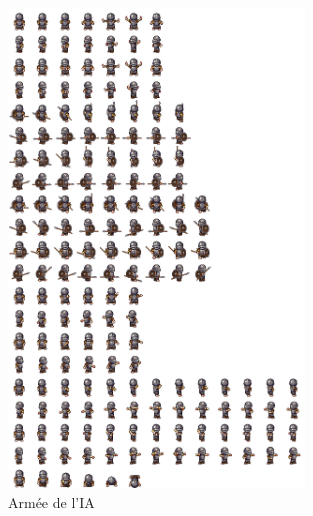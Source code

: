 \documentclass[a4paper,12pt]{article}
\begin{document}
\begin{figure}[H]
\begin{center}
  \includegraphics[width=0.7\textwidth]{images/Army_Silver.png}
  \caption{Armée de l'IA}
 \end{center}
\end{figure}
\end{document}
